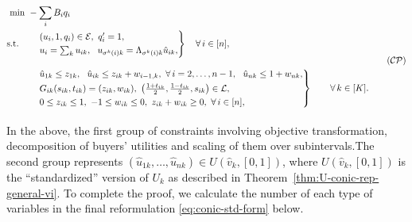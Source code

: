 \begin{align}
	\begin{split}
		\min \ & - \sum_i B_i q_i \\ 
		\st \ \ 
		   & \begin{rcases}
			   & (u_i, 1, q_i) \in \mathcal{E},\ q_i'=1, \\
			   & u_i = \sum_k u_{ik}, \ \ u_{\sigma^k(i) k} = \Lambda_{\sigma^k(i)k} \hat{u}_{ik}, 
		   \end{rcases} \quad  \forall\, i \in [n], \\[2ex]
		   & \begin{rcases}
				& \hat{u}_{1k} \leq z_{1k}, \ \ \hat{u}_{ik} \leq z_{ik} + w_{i-1,k}, \ \forall\, i=2,\dots, n-1,\ \ \hat{u}_{nk} \leq 1 + w_{nk}, \\
				& G_{ik}(s_{ik}, t_{ik}) = (z_{ik}, w_{ik}), \ \left(\frac{1+t_{ik}}{2}, \frac{1-t_{ik}}{2}, s_{ik}\right) \in \mathcal{L}, \\
				& 0\leq z_{ik} \leq 1, \ -1 \leq w_{ik} \leq 0,\ z_{ik}+w_{ik}\geq 0,\ \forall\, i \in [n],
			\end{rcases} \quad\quad \forall\, k \in [K].\\[2ex]
	\end{split}
	\label{eq:overall-conic-reform} \tag{$\mathcal{CP}$}
\end{align}
In the above, the first group of constraints involving objective transformation, decomposition of buyers' utilities and scaling of them over subintervals.The second group represents $(\hat{u}_{1k}, \dots, \hat{u}_{nk}) \in U(\hat{v}_k, [0,1])$, where $U(\hat{v}_k, [0,1])$ is the ``standardized'' version of $U_k$ as described in Theorem~\ref{thm:U-conic-rep-general-vi}.
To complete the proof, we calculate the number of each type of variables in the final reformulation \eqref{eq:conic-std-form} below. 
